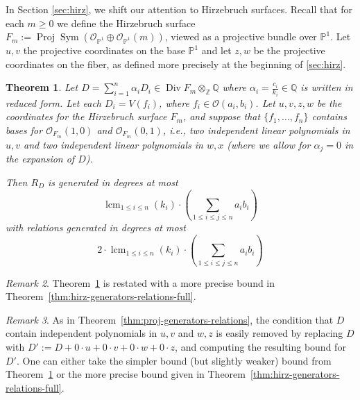 \documentclass{amsart}
\theoremstyle{plain}
\newtheorem{thm}{Theorem}[subsection]
\theoremstyle{definition}
\theoremstyle{remark}
\newtheorem{rem}[thm]{Remark}
\numberwithin{equation}{section}
\newcommand\bq{{\mathbb Q}}
\newcommand\bp{{\mathbb P}}
\newcommand\bz{{\mathbb Z}}
\newcommand\sco{{\mathscr O}}
\DeclareMathOperator{\sym}{Sym}
\DeclareMathOperator\di{Div}
\newcommand\bida{a}
\newcommand\bidb{b}
\newcommand\hirz{F}
\DeclareMathOperator{\proj}{Proj}
\DeclareMathOperator{\lcm}{lcm}
\begin{document}
In Section \ref{sec:hirz}, we shift our attention to Hirzebruch surfaces. Recall that for each $m \geq 0$ we define the
Hirzebruch surface $F_m := \proj \sym (\sco_{\bp^1} \oplus
\sco_{\bp^1}(m))$, viewed as a projective bundle over $\bp^1$.
Let $u,v$ the projective coordinates on the base $\bp^1$ and let $z,w$ be the projective coordinates
on the fiber, as defined more precisely at the beginning of
\ref{sec:hirz}.

\begin{thm}
\label{thm:hirz-generators-relations}
Let $D = \sum_{i = 1}^n \alpha_i D_i \in \di \hirz_m \otimes_\bz \bq$ where $\alpha_i = \frac{c_i}{k_i} \in \bq$ is written in reduced form.  
Let each $D_i = V(f_i)$, where $f_i \in \sco(a_i, b_i)$.
Let $u, v, z, w$ be the coordinates for the Hirzebruch surface
$\hirz_m$, and suppose that $\{f_1, \ldots, f_n\}$
contains 
bases for $\sco_{F_m}(1,0)$ and $\sco_{F_m}(0,1)$,
i.e., two independent linear polynomials in $u, v$ and two independent linear polynomials in
$w, x$ {\rm(}where we allow for $\alpha_j = 0$ in the expansion of $D${\rm)}.

Then $R_D$ is generated in degrees at most
\[
	\lcm_{1\le i\le n}(k_i)\cdot \left(\sum_{1\le i\le j\le n} \bida_i \bidb_i\right) 
\]
\noindent
with relations generated in degrees at most 
\[
	2 \cdot \lcm_{1\le i\le n}(k_i) \cdot \left( \sum_{1\le i\le j\le n} \bida_i \bidb_i\right) 
\]
\end{thm}
\begin{rem}
Theorem~\ref{thm:hirz-generators-relations} is restated with a more precise
bound in Theorem~\ref{thm:hirz-generators-relations-full}.
\end{rem}
\begin{rem}
	As in Theorem~\ref{thm:proj-generators-relations}, the condition that $D$ contain independent polynomials
	in $u,v$ and $w,z$ is easily removed by replacing $D$ with $D' :=D +0 \cdot u + 0 \cdot v + 0 \cdot w + 0 \cdot z$,
	and computing the resulting bound for $D'$.
	One can either take the simpler bound (but slightly weaker) bound from Theorem~\ref{thm:hirz-generators-relations}
	or the more precise bound given in Theorem~\ref{thm:hirz-generators-relations-full}.
\end{rem}
\end{document}
